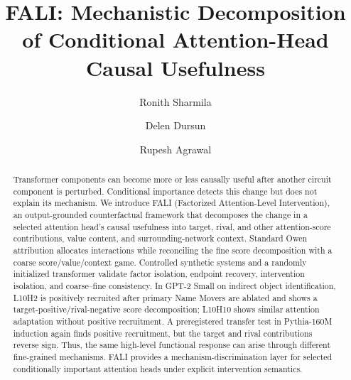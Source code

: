 \documentclass[preprint,12pt,authoryear]{elsarticle}
\begin{document}
\begin{frontmatter}

\title{FALI: Mechanistic Decomposition of Conditional Attention-Head Causal Usefulness}

\author[inst1]{Ronith Sharmila}
\author[inst2]{Delen Dursun}
\author[inst3]{Rupesh Agrawal}




\begin{abstract}
Transformer components can become more or less causally useful after another circuit component is perturbed. Conditional importance detects this change but does not explain its mechanism. We introduce FALI (Factorized Attention-Level Intervention), an output-grounded counterfactual framework that decomposes the change in a selected attention head's causal usefulness into target, rival, and other attention-score contributions, value content, and surrounding-network context. Standard Owen attribution allocates interactions while reconciling the fine score decomposition with a coarse score/value/context game. Controlled synthetic systems and a randomly initialized transformer validate factor isolation, endpoint recovery, intervention isolation, and coarse--fine consistency. In GPT-2 Small on indirect object identification, L10H2 is positively recruited after primary Name Movers are ablated and shows a target-positive/rival-negative score decomposition; L10H10 shows similar attention adaptation without positive recruitment. A preregistered transfer test in Pythia-160M induction again finds positive recruitment, but the target and rival contributions reverse sign. Thus, the same high-level functional response can arise through different fine-grained mechanisms. FALI provides a mechanism-discrimination layer for selected conditionally important attention heads under explicit intervention semantics.
\end{abstract}


\end{frontmatter}
\end{document}
